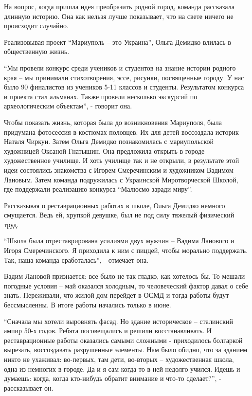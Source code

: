 На вопрос, когда пришла идея преобразить родной город, команда рассказала
длинную историю. Она как нельзя лучше показывает, что на свете ничего не
происходит случайно.

Реализовывая проект \enquote{Мариуполь – это Украина}, Ольга Демидко влилась в
общественную жизнь.

\enquote{Мы провели конкурс среди учеников и студентов на знание истории родного края –
мы принимали стихотворения, эссе, рисунки, посвященные городу. У нас было 90
финалистов из учеников 5-11 классов и студенты. Результатом конкурса и проекта
стал альманах. Также провели несколько экскурсий по археологическим объектам},
- говорит она.

Чтобы показать жизнь, которая была до возникновения Мариуполя, была придумана
фотосессия в костюмах половцев. Их для детей воссоздала историк Наталя Чиркун.
Затем Ольга Демидко познакомилась с мариупольской художницей Оксаной Гнатышин.
Она предложила открыть в городе художественное училище. И хоть училище так и не
открыли, в результате этой идеи состоялись знакомства с Игорем Смеречинским и
художником Вадимом Лановым. Затем команда подружилась с Украинской
Миротворческой Школой, где поддержали реализацию конкурса \enquote{Малюємо заради
миру}.


Рассказывая о реставрационных работах в школе, Ольга Демидко немного смущается.
Ведь ей, хрупкой девушке, был не под силу тяжелый физический труд.


\enquote{Школа была отреставрирована усилиями двух мужчин – Вадима Ланового и Игоря
Смеречинского. Я приходила к ним с пиццей, чтобы морально поддержать. Так, наша
команда сработалась}, - отмечает она.

Вадим Лановой признается: все было не так гладко, как хотелось бы. То мешали
погодные условия – май оказался холодным, то человеческий фактор давал о себе
знать. Переживали, что жилой дом перейдет в ОСМД и тогда работы будут
бессмысленны. В итоге работы начались только в июне.


\enquote{Сначала мы хотели выровнять фасад. Но здание историческое – сталинский ампир
50-х годов. Ребята посовещались и решили восстанавливать. И реставрационные
работы оказались самыми сложными - приходилось болгаркой вырезать, воссоздавать
разрушенные элементы. Нам было обидно, что за зданием никто не ухаживал:
во-первых, там дети, во-вторых – художественная школа, одна из немногих в
городе. Да и я сам когда-то в ней недолго учился. Идешь и думаешь: когда, когда
кто-нибудь обратит внимание и что-то сделает?}, - рассказывает он.

